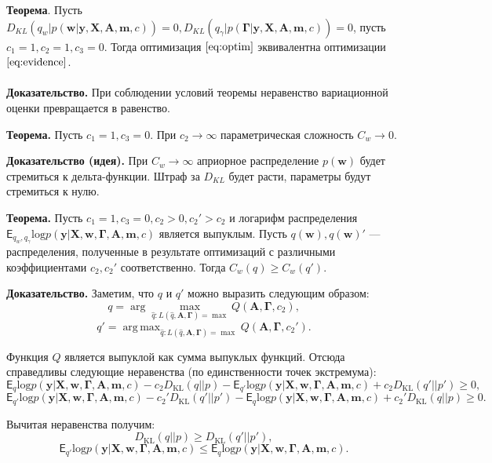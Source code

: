 \documentclass[12pt]{article}
\DeclareMathOperator*{\argmax}{arg\,max}
\begin{document}
\textbf{Теорема}. Пусть $D_{KL}(q_w|p(\mathbf{w}|\mathbf{y}, \mathbf{X}, \mathbf{A},\mathbf{m}, c)) = 0, D_{KL}(q_\gamma|p(\boldsymbol{\Gamma}|\mathbf{y}, \mathbf{X}, \mathbf{A},\mathbf{m}, c)) = 0$, пусть $c_1 = 1, c_2 = 1, c_3 = 0$. Тогда оптимизация $\eqref{eq:optim}$ эквивалентна оптимизации $\eqref{eq:evidence}$.\\~\\
\textbf{Доказательство.} При соблюдении условий теоремы неравенство вариационной оценки превращается в равенство. 

\textbf{Теорема.} Пусть $c_1 = 1, c_3 = 0$. При $c_2 \to \infty$ параметрическая сложность $C_w \to 0$.

\textbf{Доказательство (идея).} При $C_w \to \infty$ априорное распределение $p(\mathbf{w})$ будет стремиться к дельта-функции. Штраф за $D_{KL}$ будет расти, параметры будут стремиться к нулю.
   

\textbf{Теорема.} Пусть $c_1 = 1,  c_3 = 0, c_2 > 0, c_2' > c_2$ и  логарифм распределения $\mathsf{E}_{q_w,q_\gamma}\text{log} p(\mathbf{y}|\mathbf{X},\mathbf{w}, \boldsymbol{\Gamma}, \mathbf{A},\mathbf{m}, c)$ является выпуклым.
Пусть $q(\mathbf{w}), q(\mathbf{w})'$ --- распределения, полученные в результате оптимизаций с различными коэффициентами $c_2, c_2'$ соответственно. Тогда  $C_w(q) \geq C_w(q').$  

\textbf{Доказательство.}
Заметим, что $q$ и $q'$ можно выразить следующим образом:
\[
    q = \arg\max_{\hat{q}: L(\hat{q}, \mathbf{A}, \boldsymbol{\Gamma}) = \max} Q( \mathbf{A}, \boldsymbol{\Gamma}, c_2),
\]
\[
    q' = \argmax_{\hat{q}: L(\hat{q}, \mathbf{A}, \boldsymbol{\Gamma})  = \max} Q( \mathbf{A}, \boldsymbol{\Gamma}, c_2').
\]

Функция $Q$ является выпуклой как сумма выпуклых функций. Отсюда справедливы следующие неравенства (по единственности точек экстремума):
\[
    \mathsf{E}_{q}\text{log} p(\mathbf{y}|\mathbf{X},\mathbf{w}, \boldsymbol{\Gamma}, \mathbf{A},\mathbf{m}, c) - c_2  D_\text{KL}(q||p)  -  \mathsf{E}_{q'}\text{log} p(\mathbf{y}|\mathbf{X},\mathbf{w}, \boldsymbol{\Gamma}, \mathbf{A},\mathbf{m}, c) + c_2  D_\text{KL}(q'||p') \geq 0,
\]
\[
    \mathsf{E}_{q'}\text{log} p(\mathbf{y}|\mathbf{X},\mathbf{w}, \boldsymbol{\Gamma}, \mathbf{A},\mathbf{m}, c) - c_2'  D_\text{KL}(q'||p')  -  \mathsf{E}_{q}\text{log} p(\mathbf{y}|\mathbf{X},\mathbf{w}, \boldsymbol{\Gamma}, \mathbf{A},\mathbf{m}, c) + c_2'  D_\text{KL}(q||p) \geq 0.
\]

Вычитая неравенства получим:
\[
    D_\text{KL}(q||p) \geq D_\text{KL}(q'||p'),
\]
\[
    \mathsf{E}_{q'}\text{log} p(\mathbf{y}|\mathbf{X},\mathbf{w}, \boldsymbol{\Gamma}, \mathbf{A},\mathbf{m}, c)  \leq \mathsf{E}_{q}\text{log} p(\mathbf{y}|\mathbf{X},\mathbf{w}, \boldsymbol{\Gamma}, \mathbf{A},\mathbf{m}, c) .
\]
\end{document}
